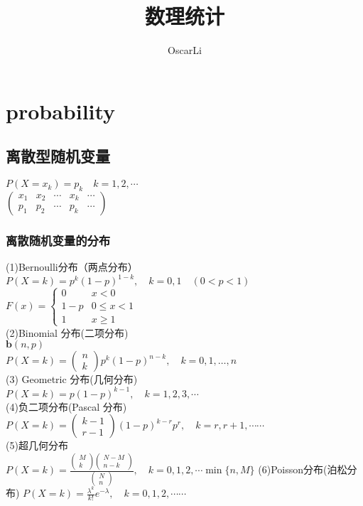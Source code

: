 \documentclass{report}
\begin{document}
\title{数理统计} 
\author{OscarLi}
\maketitle 
\chapter{probability}
\section{离散型随机变量}
$P\left(X=x_{k}\right)=p_{k} \quad k=1,2, \cdots$\\
$\left(\begin{array}{lllll}{x_{1}} & {x_{2}} & {\cdots} & {x_{k}} & {\cdots} \\ {p_{1}} & {p_{2}} & {\cdots} & {p_{k}} & {\cdots}\end{array}\right)$
\subsection{离散随机变量的分布}
(1)Bernoulli分布（两点分布）\\
$P(X=k)=p^{k}(1-p)^{1-k}, \quad k=0,1 \quad(0<p<1)$\\
$F(x)=\left\{\begin{array}{cc}{0} & {x<0} \\ {1-p} & {0 \leq x<1} \\ {1} & {x \geq 1}\end{array}\right.$\\
(2)Binomial 分布(二项分布)\\
$\boldsymbol{b}(n, p)$\\
$P(X=k)=\left(\begin{array}{l}{n} \\ {k}\end{array}\right) p^{k}(1-p)^{n-k}, \quad k=0,1, \ldots, n$\\
(3) Geometric 分布(几何分布)\\
$P(X=k)=p(1-p)^{k-1}, \quad k=1,2,3, \cdots$\\
(4)负二项分布(Pascal 分布)\\
$P(X=k)=\left(\begin{array}{c}{k-1} \\ {r-1}\end{array}\right)(1-p)^{k-r} p^{r}, \quad k=r, r+1, \cdots \cdots$\\
(5)超几何分布\\
$P(X=k)=\frac{\left(\begin{array}{c}{M} \\ {k}\end{array}\right)\left(\begin{array}{c}{N-M} \\ {n-k}\end{array}\right)}{\left(\begin{array}{c}{N} \\ {n}\end{array}\right)}, \quad k=0,1,2, \cdots \min \{n, M\}$
(6)Poisson分布(泊松分布)
$P(X=k)=\frac{\lambda^{k}}{k !} e^{-\lambda}, \quad k=0,1,2, \cdots \cdots$
\end{document}
